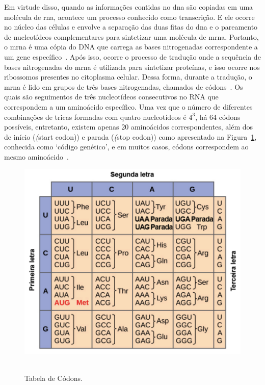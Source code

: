 Em virtude disso, quando as informações contidas no \gls{dna} são copiadas em uma molécula de \gls{rna}, acontece um processo conhecido como transcrição. E ele ocorre no núcleo das células e envolve a separação das duas fitas do \gls{dna} e o pareamento de nucleotídeos complementares para sintetizar uma molécula de \gls{mrna}. Portanto, o \gls{mrna} é uma cópia do DNA que carrega as bases nitrogenadas correspondente a um gene específico~\cite{alberts_biologia_2017}.
Após isso, ocorre o processo de tradução onde a sequência de bases nitrogenadas do \gls{mrna} é utilizada para sintetizar proteínas, e isso ocorre nos ribossomos presentes no citoplasma celular. Dessa forma, durante a tradução, o \gls{mrna} é lido em grupos de três bases nitrogenadas, chamados de códons~\cite{alberts_biologia_2017}. Os quais são seguimentos de três nucleotídeos consecutivos no RNA que correspondem a um aminoácido específico. Uma vez que o número de diferentes combinações de tricas formadas com quatro nucleotídeos é $4^3$, há 64 códons possíveis, entretanto, existem apenas 20 aminoácidos correspondentes, além dos de início (\textit(start codon)) e parada (\textit(stop codon)) como apresentado na Figura~\ref{fig:tabelaCodons}, conhecida como `código genético', e em muitos casos, códons correspondem ao mesmo aminoácido~\cite{alberts_biologia_2017}.
\begin{figure}[htb]
  \centering
  \caption{Tabela de Códons.}
  \includegraphics[scale=0.6]{figuras/tabelaCodons.pdf}
  ~\label{fig:tabelaCodons}
\end{figure}

